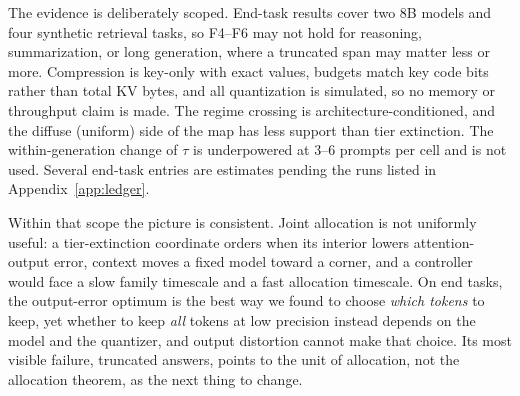 \documentclass{article}
\theoremstyle{definition}
\begin{document}
The evidence is deliberately scoped.  End-task results cover two 8B models and four synthetic retrieval tasks, so F4--F6 may not hold for reasoning, summarization, or long generation, where a truncated span may matter less or more.  Compression is key-only with exact values, budgets match key code bits rather than total KV bytes, and all quantization is simulated, so no memory or throughput claim is made.  The regime crossing is architecture-conditioned, and the diffuse (uniform) side of the map has less support than tier extinction.  The within-generation change of $\tau$ is underpowered at 3--6 prompts per cell and is not used.  Several end-task entries are estimates pending the runs listed in Appendix~\ref{app:ledger}.

Within that scope the picture is consistent.  Joint allocation is not uniformly useful: a tier-extinction coordinate orders when its interior lowers attention-output error, context moves a fixed model toward a corner, and a controller would face a slow family timescale and a fast allocation timescale.  On end tasks, the output-error optimum is the best way we found to choose \emph{which tokens} to keep, yet whether to keep \emph{all} tokens at low precision instead depends on the model and the quantizer, and output distortion cannot make that choice.  Its most visible failure, truncated answers, points to the unit of allocation, not the allocation theorem, as the next thing to change.

\label{main:end}



\clearpage
\appendix

\end{document}
